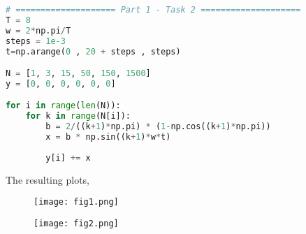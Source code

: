 \documentclass[12pt,a4paper]{article}
\begin{document}
\begin{itemize}
\begin{enumerate}
\begin{lstlisting}[language=Python, caption={Task 2, Part 1}, label={lst:code}, mathescape=true, breaklines=true]
# ==================== Part 1 - Task 2 ====================
T = 8
w = 2*np.pi/T
steps = 1e-3
t=np.arange(0 , 20 + steps , steps)

N = [1, 3, 15, 50, 150, 1500]
y = [0, 0, 0, 0, 0, 0]

for i in range(len(N)):
    for k in range(N[i]):
        b = 2/((k+1)*np.pi) * (1-np.cos((k+1)*np.pi))
        x = b * np.sin((k+1)*w*t)
        
        y[i] += x
\end{lstlisting}
\clearpage

The resulting plots,

\begin{figure}[h]
    \centering
    \texttt{[image: fig1.png]}
\end{figure}\textbf{}

\begin{figure}[h]
    \centering
    \texttt{[image: fig2.png]}
\end{figure}\textbf{}

\end{enumerate}
\end{itemize}
\clearpage

\end{document}
